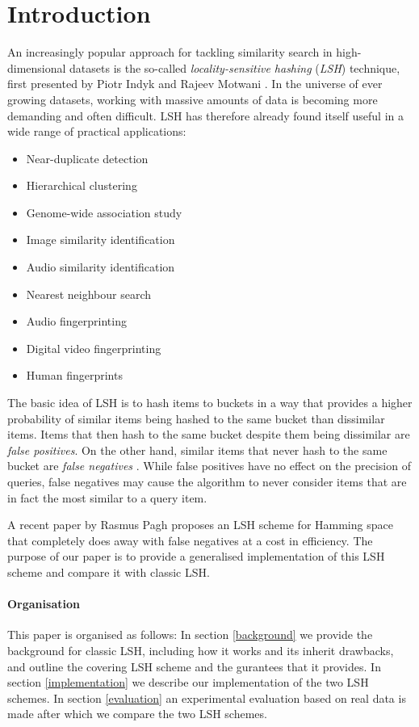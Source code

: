 \section{Introduction}
\label{introduction}

An increasingly popular approach for tackling similarity search in high-dimensional datasets is the so-called \textit{locality-sensitive hashing} (\textit{LSH}) technique, first presented by Piotr Indyk and Rajeev Motwani \cite{DBLP:conf/stoc/IndykM98}. In the universe of ever growing datasets, working with massive amounts of data is becoming more demanding and often difficult. LSH has therefore already found itself useful in a wide range of practical applications:

\begin{itemize}
  \item Near-duplicate detection
  \item Hierarchical clustering
  \item Genome-wide association study
  \item Image similarity identification
  \item Audio similarity identification
  \item Nearest neighbour search
  \item Audio fingerprinting
  \item Digital video fingerprinting
  \item Human fingerprints
\end{itemize}

The basic idea of LSH is to hash items to buckets in a way that provides a higher probability of similar items being hashed to the same bucket than dissimilar items. Items that then hash to the same bucket despite them being dissimilar are \textit{false positives}. On the other hand, similar items that never hash to the same bucket are \textit{false negatives} \cite[p. 88]{DBLP:books/cu/LeskovecRU14}. While false positives have no effect on the precision of queries, false negatives may cause the algorithm to never consider items that are in fact the most similar to a query item.

A recent paper by Rasmus Pagh \cite{DBLP:journals/corr/Pagh15} proposes an LSH scheme for Hamming space that completely does away with false negatives at a cost in efficiency. The purpose of our paper is to provide a generalised implementation of this LSH scheme and compare it with classic LSH.

\paragraph{Organisation} This paper is organised as follows: In section \ref{background} we provide the background for classic LSH, including how it works and its inherit drawbacks, and outline the covering LSH scheme and the gurantees that it provides. In section \ref{implementation} we describe our implementation of the two LSH schemes. In section \ref{evaluation} an experimental evaluation based on real data is made after which we compare the two LSH schemes.
